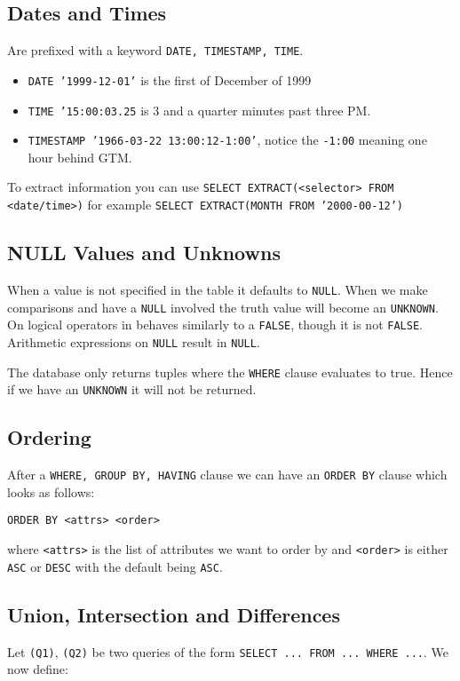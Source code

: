 \documentclass{article}
\renewcommand{\t}[1]{\texttt{#1}}
\begin{document}
\subsection*{Dates and Times}
Are prefixed with a keyword \t{DATE, TIMESTAMP, TIME}.
\begin{itemize}
	\item \t{DATE '1999-12-01'} is the first of December of 1999
	\item \t{TIME '15:00:03.25} is 3 and a quarter minutes past three PM.
	\item \t{TIMESTAMP '1966-03-22 13:00:12-1:00'}, notice the \t{-1:00} meaning one hour behind GTM.
\end{itemize}

To extract information you can use \t{SELECT EXTRACT(<selector> FROM <date/time>)} for example \t{SELECT EXTRACT(MONTH FROM '2000-00-12')}


\subsection*{NULL Values and Unknowns}

When a value is not specified in the table it defaults to \t{NULL}.
When we make comparisons and have a \t{NULL} involved the truth value will become an \t{UNKNOWN}. On logical operators in behaves similarly to a \t{FALSE}, though it is not \t{FALSE}. Arithmetic expressions on \t{NULL} result in \t{NULL}.

The database only returns tuples where the \t{WHERE} clause evaluates to true. Hence if we have an \t{UNKNOWN} it will not be returned.


\subsection*{Ordering}

After a \t{WHERE, GROUP BY, HAVING} clause we can have an \t{ORDER BY} clause which looks as follows:

\t{ORDER BY <attrs> <order>}

where \t{<attrs>} is the list of attributes we want to order by and \t{<order>} is either \t{ASC} or \t{DESC} with the default being \t{ASC}.


\subsection*{Union, Intersection and Differences}

Let \t{(Q1)}, \t{(Q2)} be two queries of the form \t{SELECT ... FROM ... WHERE ...}. We now define: 
\end{document}
